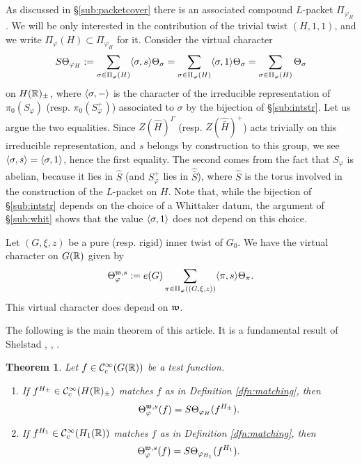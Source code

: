 \documentclass{article}
\newtheorem{thm}{Theorem}[subsection]
\theoremstyle{definition}
\numberwithin{equation}{section}
\renewcommand{\-}{\hyp{}}
\begin{document}
As discussed in \S\ref{sub:packetcover} there is an associated compound $L$\-packet $\Pi_{\varphi_H}$. We will be only interested in the contribution of the trivial twist $(H,1,1)$, and we write $\Pi_\varphi(H) \subset \Pi_{\varphi_H}$ for it. Consider the virtual character
\[ S\Theta_{\varphi_H} := \sum_{\sigma \in \Pi_\varphi(H)} \langle\sigma,s\rangle\Theta_\sigma = \sum_{\sigma \in \Pi_\varphi(H)} \langle\sigma,1\rangle\Theta_\sigma = \sum_{\sigma \in \Pi_\varphi(H)} \Theta_\sigma\]
on $H(\mathbb{R})_\pm$, where $\langle\sigma,-\rangle$ is the character of the irreducible representation of $\pi_0(S_\varphi)$ (resp. $\pi_0(S_\varphi^+)$) associated to $\sigma$ by the bijection of \S\ref{sub:intstr}. Let us argue the two equalities. Since $Z(\hat H)^\Gamma$ (resp. $Z(\hat{\bar H})^+$) acts trivially on this irreducible representation, and $s$ belongs by construction to this group, we see $\langle\sigma,s\rangle=\langle\sigma,1\rangle$, hence the first equality. The second comes from the fact that $S_\varphi$ is abelian, because it lies in $\hat S$ (and $S_\varphi^+$ lies in $\hat{\bar S}$), where $\hat S$ is the torus involved in the construction of the $L$\-packet on $H$. Note that, while the bijection of \S\ref{sub:intstr} depends on the choice of a Whittaker datum, the argument of \S\ref{sub:whit} shows that the value $\langle\sigma,1\rangle$ does not depend on this choice.

Let $(G,\xi,z)$ be a pure (resp. rigid) inner twist of $G_0$. We have the virtual character on $G(\mathbb{R})$ given by
\[ \Theta_{\varphi}^{\mathfrak{w},s} := e(G)\sum_{\pi \in \Pi_\varphi((G,\xi,z))} \langle\pi,s\rangle\Theta_\pi. \]
This virtual character does depend on $\mathfrak{w}$.

The following is the main theorem of this article. It is a fundamental result of Shelstad \cite{She82}, \cite{SheTE2}, \cite{SheTE3}.
\begin{thm} \label{thm:main1}
Let $f \in \mathcal{C}^\infty_c(G(\mathbb{R}))$ be a test function.
\begin{enumerate}
	\item If $f^{H_\pm} \in \mathcal{C}^\infty_c(H(\mathbb{R})_\pm)$ matches $f$ as in Definition \ref{dfn:matching}, then
	\[ \Theta_\varphi^{\mathfrak{w},s}(f) = S\Theta_{\varphi_H}(f^{H_\pm}). \]
	\item If $f^{H_1} \in \mathcal{C}^\infty_c(H_1(\mathbb{R}))$ matches $f$ as in Definition \ref{dfn:matching}, then
	\[ \Theta_\varphi^{\mathfrak{w},s}(f) = S\Theta_{\varphi_{H_1}}(f^{H_1}). \]
\end{enumerate}
\end{thm}
\end{document}
